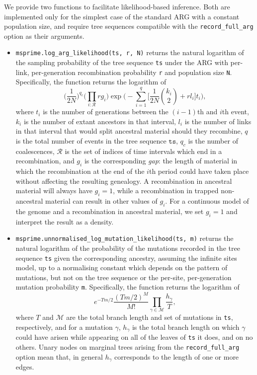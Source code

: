 \documentclass{article}
\begin{document}
We provide two functions to facilitate likelihood-based inference.
Both are implemented only for the simplest case of the standard ARG with a
constant population size, and require tree sequences compatible with the
\texttt{record\_full\_arg} option as their arguments.
\begin{itemize}
\item \texttt{msprime.log\_arg\_likelihood(ts, r, N)} returns the natural logarithm of
the sampling probability of the tree sequence \texttt{ts} under the ARG with per-link,
per-generation recombination probability \texttt{r} and population size \texttt{N}.
Specifically, the function returns the logarithm of
\begin{equation*}
\Bigg( \frac{ 1 }{ 2 N } \Bigg)^{ q_c } \Bigg( \prod_{ i : \mathcal{R} } r g_i \Bigg)
	\exp\Bigg( -\sum_{ i = 1 }^q \Big[\frac{ 1 }{ 2 N } \binom{ k_i }{ 2 }
		+ r l_i \Big] t_i  \Bigg),
\end{equation*}
where $t_i$ is the number of generations between the $(i - 1)$th and $i$th event,
$k_i$ is the number of extant ancestors in that interval, $l_i$ is the number of links
in that interval that would split ancestral material should they recombine,
$q$ is the total number of events in the tree sequence $\texttt{ts}$,
$q_c$ is the number of coalescences, $\mathcal{R}$ is the set of indices
of time intervals which end in a recombination, and $g_i$ is the corresponding
\emph{gap}:  the length of material in which the recombination at the end of the
$i$th period could have taken place without affecting the resulting genealogy.
A recombination in ancestral material will always have $g_i = 1$, while a recombination
in trapped non-ancestral material can result in other values of $g_i$.
For a continuous model of the genome and a recombination in ancestral material,
we set $g_i = 1$ and interpret the result as a density.
\item \texttt{msprime.unnormalised\_log\_mutation\_likelihood(ts, m)} returns the
natural logarithm of the probability of the mutations recorded in the tree sequence
\texttt{ts} given the corresponding ancestry, assuming the infinite sites model, up to
a normalising constant which depends on the pattern of mutations,
but not on the tree sequence or the per-site, per-generation mutation
probability \texttt{m}.
Specifically, the function returns the logarithm of
\begin{equation*}
e^{ - T m / 2 } \frac{ ( T m / 2 )^M }{ M ! }
\prod_{ \gamma \in \mathcal{ M } } \frac{ h_{ \gamma } }{ T },
\end{equation*}
where $T$ and $\mathcal{M}$ are the total branch length and set of mutations
in \texttt{ts}, respectively, and for a mutation $\gamma$, $h_{ \gamma }$ is the
total branch length on which $\gamma$ could have arisen while appearing on all
of the leaves of \texttt{ts} it does, and on no others.
Unary nodes on marginal trees arising from the \texttt{record\_full\_arg} option
mean that, in general $h_{ \gamma }$ corresponds to the length of one or more
edges.
\end{itemize}
\end{document}
